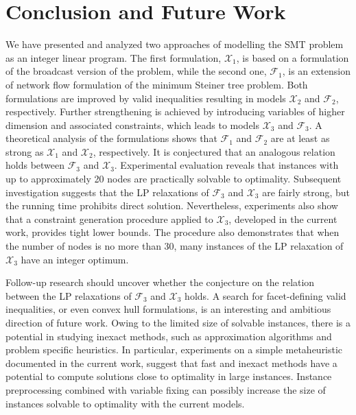 \section{Conclusion and Future Work}
\label{sec:conclusion}
We have presented and analyzed two approaches of modelling the SMT problem as an integer linear program.
The first formulation, $\mathcal{X}_1$, is based on a formulation of the broadcast version of the problem, while the second one,
$\mathcal{F}_1$, is an extension of network flow formulation of the minimum Steiner tree problem.
Both formulations are improved by valid inequalities resulting in models $\mathcal{X}_2$ and $\mathcal{F}_2$, respectively. 
Further strengthening is achieved by introducing variables of higher dimension and associated constraints, which leads to models $\mathcal{X}_3$ and $\mathcal{F}_3$.
A theoretical analysis of the formulations shows that  $\mathcal{F}_1$ and $\mathcal{F}_2$ are at least as strong as $\mathcal{X}_1$ and $\mathcal{X}_2$, respectively. 
It is conjectured that an analogous relation holds between $\mathcal{F}_3$ and $\mathcal{X}_3$.
Experimental evaluation reveals that instances with up to approximately 20 nodes are practically solvable to optimality.
Subsequent investigation suggests that the LP relaxations of $\mathcal{F}_3$ and $\mathcal{X}_3$ are fairly strong, but the running time prohibits direct solution.
Nevertheless, experiments also show that a constraint generation procedure applied to $\mathcal{X}_3$, developed in the current work, provides tight lower bounds.
The procedure also demonstrates that when the number of nodes is no more than 30, many instances of the LP relaxation of $\mathcal{X}_3$ have an integer optimum.

Follow-up research should uncover whether the conjecture on the relation between the LP relaxations of $\mathcal{F}_3$ and $\mathcal{X}_3$ holds.
A search for facet-defining valid inequalities, or even convex hull formulations, is an interesting and ambitious direction of future work.
Owing to the limited size of solvable instances, there is a potential in studying inexact methods, such as approximation algorithms and problem specific heuristics.
In particular, experiments on a simple metaheuristic documented in the current work, 
suggest that fast and inexact methods have a potential to compute solutions close to optimality in large instances.
Instance preprocessing combined with variable fixing can possibly increase the size of instances solvable to optimality with the current models.


